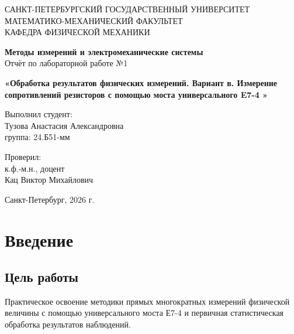 \documentclass[14pt,a4paper]{extarticle}
\begin{document}
\thispagestyle{empty}

\begin{center}
САНКТ-ПЕТЕРБУРГСКИЙ ГОСУДАРСТВЕННЫЙ УНИВЕРСИТЕТ\\
МАТЕМАТИКО-МЕХАНИЧЕСКИЙ ФАКУЛЬТЕТ\\
КАФЕДРА ФИЗИЧЕСКОЙ МЕХАНИКИ
\end{center}

\vspace{4cm}

\begin{center}
\textbf{Методы измерений и электромеханические системы}\\
\vspace{0.5cm}
Отчёт по лабораторной работе №1
\end{center}

\vspace{0.5cm}

\begin{center}
\textbf{«Обработка результатов физических измерений. Вариант в. Измерение сопротивлений резисторов с помощью моста универсального E7-4 »}
\end{center}

\vspace{4cm}

\begin{flushright}
Выполнил студент:\\
Тузова Анастасия Александровна\\
группа: 24.Б51-мм

\vspace{1.5cm}

Проверил:\\
к.ф.-м.н., доцент\\
Кац Виктор Михайлович
\end{flushright}

\vfill

\begin{center}
Санкт-Петербург, 2026 г.
\end{center}
\newpage   
\tableofcontents 
\newpage
\section{Введение}
\subsection{Цель работы}
Практическое освоение методики прямых многократных измерений физической величины с помощью универсального моста Е7-4 и первичная статистическая обработка результатов наблюдений.
\end{document}
